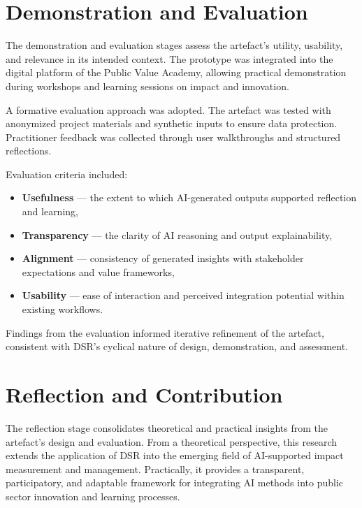 \section{Demonstration and Evaluation}\label{sec:demonstration-evaluation}

The demonstration and evaluation stages assess the artefact’s utility, usability, and relevance in its intended context.
The prototype was integrated into the digital platform of the Public Value Academy, allowing practical demonstration during workshops and learning sessions on impact and innovation.

A formative evaluation approach was adopted.
The artefact was tested with anonymized project materials and synthetic inputs to ensure data protection.
Practitioner feedback was collected through user walkthroughs and structured reflections.

Evaluation criteria included:
\begin{itemize}
    \item \textbf{Usefulness} — the extent to which AI-generated outputs supported reflection and learning,
    \item \textbf{Transparency} — the clarity of AI reasoning and output explainability,
    \item \textbf{Alignment} — consistency of generated insights with stakeholder expectations and value frameworks,
    \item \textbf{Usability} — ease of interaction and perceived integration potential within existing workflows.
\end{itemize}

Findings from the evaluation informed iterative refinement of the artefact, consistent with DSR’s cyclical nature of design, demonstration, and assessment.


\section{Reflection and Contribution}\label{sec:reflection-contribution}

The reflection stage consolidates theoretical and practical insights from the artefact’s design and evaluation.
From a theoretical perspective, this research extends the application of DSR into the emerging field of AI-supported impact measurement and management.
Practically, it provides a transparent, participatory, and adaptable framework for integrating AI methods into public sector innovation and learning processes.

